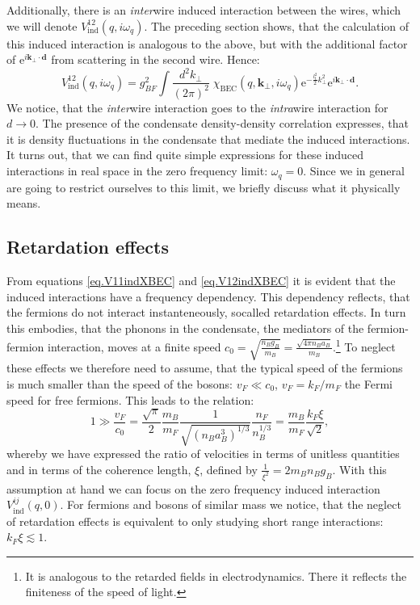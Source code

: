 Additionally, there is an \textit{inter}wire induced interaction between the wires, which we will denote $V_{\text{ind}}^{12}(q,i\omega_q)$. The preceding section shows, that the calculation of this induced interaction is analogous to the above, but with the additional factor of $\text{e}^{i\mathbf{k}_\perp\cdot \mathbf{d}}$ from scattering in the second wire. Hence:
\begin{equation}
V_{\text{ind}}^{12}(q,i\omega_q) = g_{BF}^2\int\frac{d^2k_\perp}{(2\pi)^2}\; \chi_\text{BEC}(q,\mathbf{k}_\perp, i\omega_q)\text{e}^{-\frac{l_t^2}{2}k_\perp^2}\text{e}^{i\mathbf{k}_\perp\cdot \mathbf{d}}. 
\label{eq.V12indXBEC} 
\end{equation}
We notice, that the \textit{inter}wire interaction goes to the \textit{intra}wire interaction for $d \to 0$. The presence of the condensate density-density correlation expresses, that it is density fluctuations in the condensate that mediate the induced interactions. It turns out, that we can find quite simple expressions for these induced interactions in real space in the zero frequency limit: $\omega_q = 0$. Since we in general are going to restrict ourselves to this limit, we briefly discuss what it physically means. 

\subsection{Retardation effects} \label{sec.RetardationEffects}
From equations \eqref{eq.V11indXBEC} and \eqref{eq.V12indXBEC} it is evident that the induced interactions have a frequency dependency. This dependency reflects, that the fermions do not interact instanteneously, socalled retardation effects. In turn this embodies, that the phonons in the condensate, the mediators of the fermion-fermion interaction, moves at a finite speed $c_0 = \sqrt{\frac{n_Bg_B}{m_B}} = \frac{\sqrt{4\pi n_B a_B}}{m_B}$.\footnote{It is analogous to the retarded fields in electrodynamics. There it reflects the finiteness of the speed of light.} To neglect these effects we therefore need to assume, that the typical speed of the fermions is much smaller than the speed of the bosons: $v_F \ll c_0$, $v_F = k_F/m_F$ the Fermi speed for free fermions. This leads to the relation:
\begin{equation}
1 \gg \frac{v_F}{c_0} = \frac{\sqrt{\pi}}{2} \frac{m_B}{m_F}\frac{1}{ \sqrt{ (n_Ba_B^3)^{1/3} } }\frac{n_F}{ n_B^{1/3} } = \frac{m_B}{m_F}\frac{k_F\xi}{\sqrt{2}}, 
\label{eq.RetardationEffectsneglectionassumption}
\end{equation}
whereby we have expressed the ratio of velocities in terms of unitless quantities and in terms of the coherence length, $\xi$, defined by $\frac{1}{\xi^2} = 2m_Bn_Bg_B$. With this assumption at hand we can focus on the zero frequency induced interaction $V^{ij}_{\text{ind}}(q,0)$. For fermions and bosons of similar mass we notice, that the neglect of retardation effects is equivalent to only studying short range interactions: $k_F\xi \lesssim 1$. 

